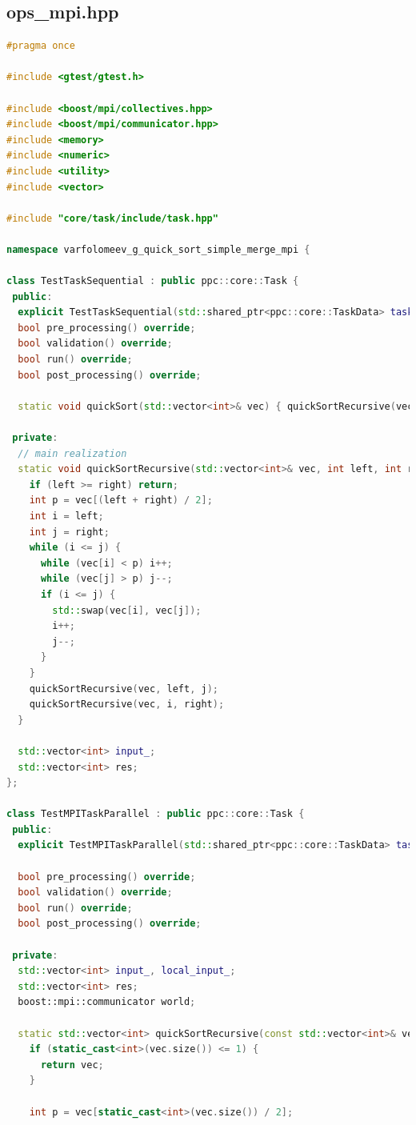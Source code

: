 \documentclass[a4paper,12pt]{article}
\begin{document}
\subsection{ops\_mpi.hpp}
\begin{lstlisting}[language=C++]
#pragma once

#include <gtest/gtest.h>

#include <boost/mpi/collectives.hpp>
#include <boost/mpi/communicator.hpp>
#include <memory>
#include <numeric>
#include <utility>
#include <vector>

#include "core/task/include/task.hpp"

namespace varfolomeev_g_quick_sort_simple_merge_mpi {

class TestTaskSequential : public ppc::core::Task {
 public:
  explicit TestTaskSequential(std::shared_ptr<ppc::core::TaskData> taskData_) : Task(std::move(taskData_)) {}
  bool pre_processing() override;
  bool validation() override;
  bool run() override;
  bool post_processing() override;

  static void quickSort(std::vector<int>& vec) { quickSortRecursive(vec, 0, vec.size() - 1); }

 private:
  // main realization
  static void quickSortRecursive(std::vector<int>& vec, int left, int right) {
    if (left >= right) return;
    int p = vec[(left + right) / 2];
    int i = left;
    int j = right;
    while (i <= j) {
      while (vec[i] < p) i++;
      while (vec[j] > p) j--;
      if (i <= j) {
        std::swap(vec[i], vec[j]);
        i++;
        j--;
      }
    }
    quickSortRecursive(vec, left, j);
    quickSortRecursive(vec, i, right);
  }

  std::vector<int> input_;
  std::vector<int> res;
};

class TestMPITaskParallel : public ppc::core::Task {
 public:
  explicit TestMPITaskParallel(std::shared_ptr<ppc::core::TaskData> taskData_) : Task(std::move(taskData_)) {}

  bool pre_processing() override;
  bool validation() override;
  bool run() override;
  bool post_processing() override;

 private:
  std::vector<int> input_, local_input_;
  std::vector<int> res;
  boost::mpi::communicator world;

  static std::vector<int> quickSortRecursive(const std::vector<int>& vec) {
    if (static_cast<int>(vec.size()) <= 1) {
      return vec;
    }

    int p = vec[static_cast<int>(vec.size()) / 2];


\end{lstlisting}
\end{document}
